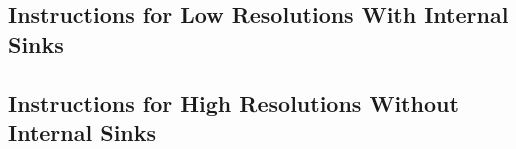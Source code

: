 \documentclass{article}
\begin{document}
\begin{enumerate}
%
%
%
\end{enumerate}

\subsection{Instructions for Low Resolutions With Internal Sinks}
\subsection{Instructions for High Resolutions Without Internal Sinks}

{}

\end{document}
